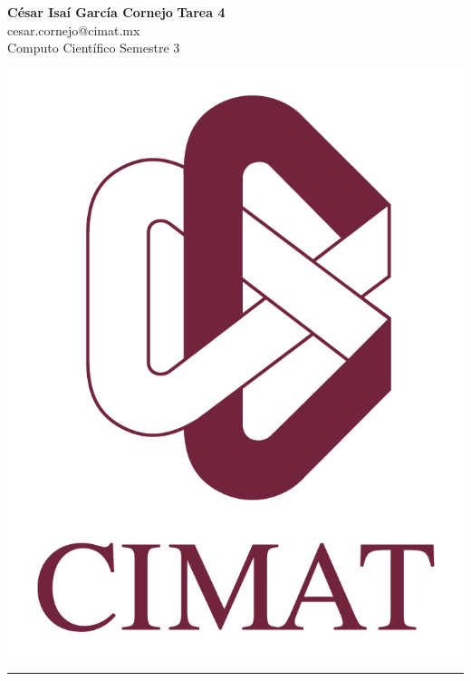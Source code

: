 \documentclass[a4paper, 11pt]{article}
\begin{document}
	\noindent
	
	\begin{minipage}[b][1.2cm][t]{0.8\textwidth}
		\large\textbf{César Isaí García Cornejo} \hfill \textbf{Tarea 4}  \\
		cesar.cornejo@cimat.mx \hfill \\
		\normalsize Computo Científico \hfill Semestre 3\\
	\end{minipage}
	
	\hspace{14.4cm}
	\begin{minipage}[b][0.03cm][t]{0.12\linewidth}
		
		\vspace{-2.2cm}
		\includegraphics[scale=0.3]{Figures/EscudoCimat.png}
	\end{minipage}
	
	\noindent\rule{7in}{2.8pt}
	
\end{document}
